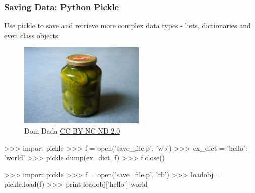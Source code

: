 \documentclass[xcolor=table,10pt]{beamer}
\begin{document}
\begin{frame}[fragile]
  \frametitle{Saving Data: Python Pickle}

  Use pickle to save and retrieve more complex data types - lists,
  dictionaries and even class objects:

  \bigskip\pause

  \begin{figure}
    \centering
    \includegraphics[width=6cm]{pickle.jpg}
    \caption*{\scriptsize  \textcopyright Dom Dada \href{http://creativecommons.org/licenses/by-nc-nd/2.0/}{CC BY-NC-ND 2.0}}
  \end{figure}
  
  \vspace{-5.6cm}
  \begin{mlinepython}
    >>> import pickle 
    >>> f = open('save_file.p', 'wb')
    >>> ex_dict = {'hello': 'world'}
    >>> pickle.dump(ex_dict, f)
    >>> f.close()
  \end{mlinepython}

  \bigskip{}

  \begin{mlinepython}
    >>> import pickle 
    >>> f = open('save_file.p', 'rb')
    >>> loadobj = pickle.load(f)
    >>> print loadobj['hello']
    world
  \end{mlinepython}

\end{frame}
\end{document}
